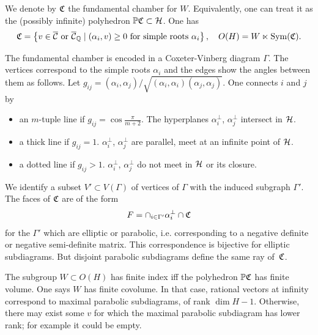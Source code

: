 \documentclass{amsart}
\begin{document}
\begin{definition}\label{def:chambers}
  We denote by ${\mathfrak C}$ the fundamental chamber for $W$. Equivalently,
  one can treat it as the (possibly infinite) polyhedron ${\mathbb P}{\mathfrak C} \subset
  {\mathcal H}$. One has 
\begin{displaymath}
  {\mathfrak C} = \left\{ v\in\overline{{\mathcal C}} \text{ or } \overline{{\mathcal C}}_{\mathbb Q} \mid
    (\alpha_i, v) \ge 0 
    \text{ for simple roots } \alpha_i \right\},
  \quad O(H) = W \ltimes \operatorname{Sym}({\mathfrak C}).
\end{displaymath}
\end{definition}

The fundamental chamber is encoded in a Coxeter-Vinberg diagram
$\Gamma$. The vertices correspond to the simple roots $\alpha_i$ and the
edges show the angles between them as follows. Let
$g_{ij} = (\alpha_i,\alpha_j) / \sqrt{(\alpha_i,\alpha_i)
  (\alpha_j,\alpha_j)}$. One connects $i$ and $j$ by
\begin{itemize}
\item an $m$-tuple line if $g_{ij} = \cos\frac{\pi}{m+2}$. The
  hyperplanes $\alpha_i^\perp$, $\alpha_j^\perp$ intersect in ${\mathcal H}$.
\item a thick line if $g_{ij}=1$. $\alpha_i^\perp$,
  $\alpha_j^\perp$ are parallel, meet at an infinite point of ${\mathcal H}$.
\item a dotted line if $g_{ij} > 1$. $\alpha_i^\perp$,
  $\alpha_j^\perp$ do not meet in ${\mathcal H}$ or its closure.
\end{itemize}

We identify a subset $V'\subset V(\Gamma)$ of vertices of $\Gamma$
with the induced subgraph $\Gamma'$. 
The faces of ${\mathfrak C}$ are of the form 
\begin{equation}\label{eq:ch-faces}
  F = \cap_{i\in \Gamma'} \alpha_i^\perp \cap{\mathfrak C}
\end{equation}
for the $\Gamma'$ which are elliptic or parabolic, i.e. corresponding
to a negative definite or negative semi-definite matrix.
This correspondence is bijective for elliptic
subdiagrams. But disjoint parabolic subdiagrams define the same ray
of~${\mathfrak C}$.

The subgroup $W\subset O(H)$ has finite index iff the polyhedron
${\mathbb P}{\mathfrak C}$ has finite volume. One says $W$ has finite covolume.
In that case, rational vectors at infinity
correspond to maximal parabolic subdiagrams, of rank $\dim
H-1$. Otherwise, there may exist some $v$ for which the maximal parabolic
subdiagram has lower rank; for example it could be empty. 

\medskip
\end{document}
